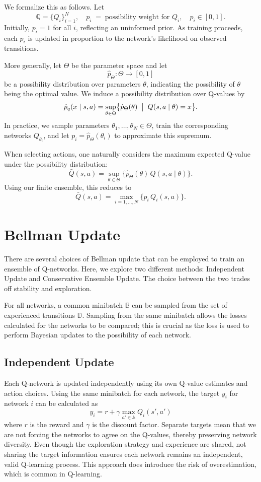 \documentclass[11pt,a4paper]{report}
\begin{document}
We formalize this as follows. Let
\[
\mathbb{Q} = \{Q_i\}_{i=1}^N,\quad
p_i \;=\;\text{possibility weight for }Q_i,\quad
p_i\in[0,1].
\]
Initially, \(p_i = 1\) for all \(i\), reflecting an uninformed prior. As training proceeds, each \(p_i\) is updated in proportion to the network’s likelihood on observed transitions.

More generally, let \(\Theta\) be the parameter space and let
\[
\hat{p}_\Theta:\Theta\to[0,1]
\]
be a possibility distribution over parameters \(\theta\), indicating the possibility of $\theta$ being the optimal value. We induce a possibility distribution over Q-values by
\[
\hat{p}_q(x\mid s,a)
=\sup_{\theta\in\Theta}\bigl\{\hat{p}_\Theta(\theta)\;\bigm|\;Q(s,a\mid\theta)=x\bigr\}.
\]
In practice, we sample parameters \(\theta_1,\dots,\theta_N\in\Theta\), train the corresponding networks \(Q_{\theta_i}\), and let \(p_i = \hat{p}_\Theta(\theta_i)\) to approximate this supremum.

When selecting actions, one naturally considers the maximum expected Q-value under the possibility distribution:
\[ \bar{Q}(s,a) =\sup_{\theta\in\Theta}\bigl\{\hat{p}_\Theta(\theta)\,Q(s,a\mid\theta)\bigr\}. \]
Using our finite ensemble, this reduces to
\[ \bar{Q}(s,a) =\max_{i=1,\dots,N}\bigl\{p_i\,Q_i(s,a)\bigr\}. \]

\section{Bellman Update}
There are several choices of Bellman update that can be employed to train an ensemble of Q-networks. Here, we explore two different methods: Independent Update and Conservative Ensemble Update. The choice between the two trades off stability and exploration.

For all networks, a common minibatch \(\mathbb{B}\) can be sampled from the set of experienced transitions \(\mathbb{D}\). Sampling from the same minibatch allows the losses calculated for the networks to be compared; this is crucial as the loss is used to perform Bayesian updates to the possibility of each network.

\subsection{Independent Update}
Each Q-network is updated independently using its own Q-value estimates and action choices. Using the same minibatch for each network, the target \(y_i\) for network \(i\) can be calculated as 
\[
  y_i = r + \gamma \max_{a' \in \mathbb{A}} Q_i(s', a')
\]
where \(r\) is the reward and \(\gamma\) is the discount factor. Separate targets mean that we are not forcing the networks to agree on the Q-values, thereby preserving network diversity. Even though the exploration strategy and experience are shared, not sharing the target information ensures each network remains an independent, valid Q-learning process. This approach does introduce the risk of overestimation, which is common in Q-learning.
\end{document}
